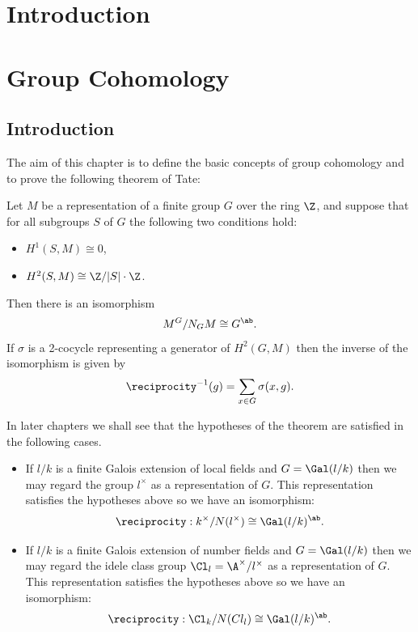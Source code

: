 
\chapter{Introduction}



\chapter{Group Cohomology}

\section{Introduction}

The aim of this chapter is to define the basic concepts of group cohomology and to
prove the following theorem of Tate:

\begin{theorem}
	Let $M$ be a representation of a finite group $G$ over the ring $\Z$, and suppose
	that for all subgroups $S$ of $G$ the following two conditions hold:
	\begin{itemize}
		\item
		$H^1(S,M) \cong 0$,
		\item
		$H^2(S,M) \cong \Z / |S| \cdot \Z$.
	\end{itemize}
	Then there is an isomorphism
	\[
		 M^G / N_G M \cong G^{\ab}.
	\]
	If $\sigma$ is a 2-cocycle representing a generator of $H^2(G,M)$ then the inverse of the
	isomorphism is given by
	\[
		\reciprocity^{-1}(g) = \sum_{x \in G} \sigma(x,g).
	\]
\end{theorem}

In later chapters we shall see that the hypotheses of the theorem are satisfied in the following
cases.
\begin{itemize}
	\item
	If $l/k$ is a finite Galois extension of local fields and $G = \Gal(l/k)$ then we
	may regard the group $l^\times$ as a representation of $G$. This representation
	satisfies the hypotheses above so we have an isomorphism:
	\[
		\reciprocity :  k^\times / N(l^\times) \cong \Gal(l/k)^{\ab}.
	\]
	\item
	If $l/k$ is a finite Galois extension of number fields and $G = \Gal(l/k)$ then we
	may regard the idele class group $\Cl_l = \A^\times / l^\times$ as a representation of $G$.
	This representation satisfies the hypotheses above so we have an isomorphism:
	\[
		\reciprocity : \Cl_k / N(Cl_l) \cong \Gal(l/k)^{\ab} .
	\]
\end{itemize}






